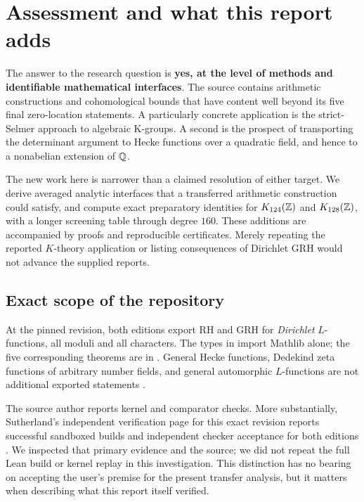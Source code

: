 \section{Assessment and what this report adds}

The answer to the research question is \textbf{yes, at the level of methods
and identifiable mathematical interfaces}. The source contains arithmetic
constructions and cohomological bounds that have content well beyond its
five final zero-location statements. A particularly concrete application is
the strict-Selmer approach to algebraic K-groups. A second is the prospect of
transporting the determinant argument to Hecke functions over a quadratic
field, and hence to a nonabelian extension of $\mathbb Q$.

The new work here is narrower than a claimed resolution of either target.
We derive averaged analytic interfaces that a transferred arithmetic
construction could satisfy, and compute exact preparatory identities for
$K_{124}(\mathbb Z)$ and $K_{128}(\mathbb Z)$, with a longer screening table through
degree $160$. These additions are accompanied by proofs and reproducible
certificates. Merely repeating the reported $K$-theory application or
listing consequences of Dirichlet GRH would not advance the supplied reports.

\subsection{Exact scope of the repository}

At the pinned revision, both editions export RH and GRH for
\emph{Dirichlet} $L$-functions, all moduli and all characters. The types in
 import Mathlib alone; the five corresponding
theorems are in . General Hecke functions,
Dedekind zeta functions of arbitrary number fields, and general automorphic
$L$-functions are not additional exported statements \cite{repo}.

The source author reports kernel and comparator checks. More substantially,
Sutherland's independent verification page for this exact revision reports
successful sandboxed builds and independent checker acceptance for both
editions \cite{shortchecks}. We inspected that primary evidence and the
source; we did not repeat the full Lean build or kernel replay in this
investigation. This distinction has no bearing on accepting the user's
premise for the present transfer analysis, but it matters when describing
what this report itself verified.

